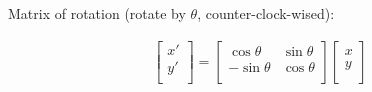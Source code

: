 Matrix of rotation (rotate by $\theta$, counter-clock-wised):

\begin{equation*}
  \begin{aligned}
    \left[
      \begin{array}{ccc}
       x' \\
       y' \\
      \end{array}
    \right]
    =
    \left[
      \begin{array}{ccc}
       \cos \theta & \sin \theta \\
       - \sin \theta & \cos \theta \\
      \end{array}
    \right]
    \left[
      \begin{array}{ccc}
       x \\
       y \\
      \end{array}
    \right]
  \end{aligned}
\end{equation*}

